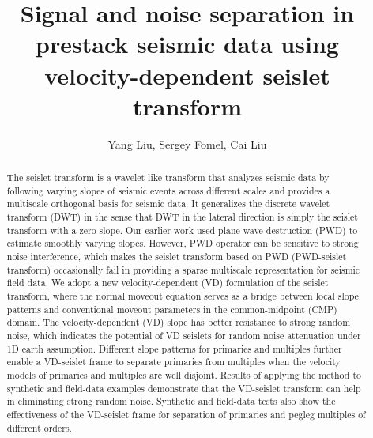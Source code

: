  
\title{Signal and noise separation in prestack seismic data using velocity-dependent seislet transform}

\renewcommand{\thefootnote}{\fnsymbol{footnote}}

\address{
\footnotemark[1] College of Geo-exploration Science and Technology,\\
Jilin University \\
No.938 Xi minzhu street, \\
Changchun, China, 130026 \\
\footnotemark[2] Bureau of Economic Geology,\\
John A. and Katherine G. Jackson School of Geosciences \\
The University of Texas at Austin \\
University Station, Box X \\
Austin, TX, USA, 78713-8924}

\author{Yang Liu\footnotemark[1], Sergey Fomel\footnotemark[2], Cai Liu\footnotemark[1]}

\maketitle

\begin{abstract}
The seislet transform is a wavelet-like transform that analyzes
seismic data by following varying slopes of seismic events across
different scales and provides a multiscale orthogonal basis for
seismic data. It generalizes the discrete wavelet transform (DWT) in
the sense that DWT in the lateral direction is simply the seislet
transform with a zero slope. Our earlier work used plane-wave
destruction (PWD) to estimate smoothly varying slopes.  However, PWD
operator can be sensitive to strong noise interference, which makes
the seislet transform based on PWD (PWD-seislet transform)
occasionally fail in providing a sparse multiscale representation for
seismic field data. We adopt a new velocity-dependent (VD) formulation
of the seislet transform, where the normal moveout equation serves as
a bridge between local slope patterns and conventional moveout
parameters in the common-midpoint (CMP) domain. The velocity-dependent
(VD) slope has better resistance to strong random noise, which
indicates the potential of VD seislets for random noise attenuation
under 1D earth assumption. Different slope patterns for primaries and
multiples further enable a VD-seislet frame to separate primaries from
multiples when the velocity models of primaries and multiples are well
disjoint. Results of applying the method to synthetic and field-data
examples demonstrate that the VD-seislet transform can help in
eliminating strong random noise. Synthetic and field-data tests also
show the effectiveness of the VD-seislet frame for separation of
primaries and pegleg multiples of different orders.
\end{abstract}

